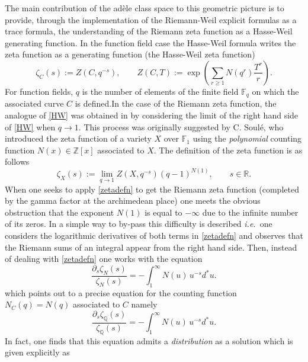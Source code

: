 \documentclass[graybox, envcountsect%
]{svmult}
\def\F{{\mathbb F}}
\def\Q{{\mathbb Q}}
\def\R{{\mathbb R}}
\def\Z{{\mathbb Z}}
\newcommand{\ie}{{\it i.e.\/}\ }
\def\no{\noindent}
\begin{document}
\no The main contribution of the ad\`ele class space to this geometric picture is to provide, through the implementation of  the Riemann-Weil explicit formulas as a trace formula, the understanding of  the Riemann zeta function as a Hasse-Weil generating function. \newline In the function field case the Hasse-Weil formula
writes the  zeta function as a  generating function (the Hasse-Weil zeta function)  
\begin{equation}\label{HW}
\zeta_C(s):=Z(C,q^{-s}), \qquad  Z(C,T) := \exp\left(\sum_{r\geq 1}N(q^r)\frac{T^r}{r}\right).
\end{equation}
For function fields, $q$ is the number of elements of the  finite field $\F_q$ on which the associated curve $C$ is defined.\newline In the case of the Riemann zeta function, the analogue of \eqref{HW} was obtained in \cite{CC0,CC0.5} by considering the limit of the right hand side of \eqref{HW} when $q\to 1$. This process was originally suggested by C. Soul\' e, who introduced the zeta function of a variety $X$ over $\F_1$ using the {\em polynomial} counting function $N(x)\in\Z[x]$ associated to $X$. The definition of the zeta function is as follows
\begin{equation}\label{zetadefn}
\zeta_X(s):=\lim_{q\to 1}Z(X,q^{-s}) (q-1)^{N(1)},\qquad s\in\R.
\end{equation}
 When one seeks to apply \eqref{zetadefn} to get the Riemann zeta function (completed by the gamma factor at the archimedean place) one meets the obvious obstruction that the exponent $N(1)$ is equal to $-\infty$ due to the infinite number of its zeros. In \cite{CC0,CC0.5}  a simple way to by-pass this difficulty is described \ie one considers the logarithmic derivatives of both terms in \eqref{zetadefn} and observes that the Riemann sums of an integral appear from the right hand side. Then, instead of  dealing with \eqref{zetadefn} one works with the equation
\begin{equation}\label{logzetabis}
    \frac{\partial_s\zeta_N(s)}{\zeta_N(s)}=-\int_1^\infty  N(u)\, u^{-s}d^*u.
\end{equation} 
which points out to a precise equation for the counting function $N_C(q)=N(q)$ associated to $C$ namely
\begin{equation}\label{special}
   \frac{\partial_s\zeta_\Q(s)}{\zeta_\Q(s)}=-\int_1^\infty  N(u)\, u^{-s}d^*u.
\end{equation}
In fact, one finds that this equation admits a \emph{distribution} as a solution which is given explicitly as
\end{document}
